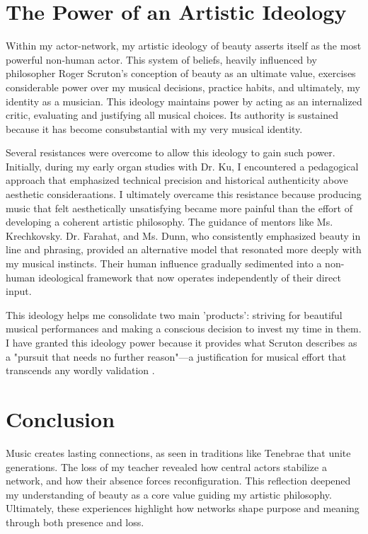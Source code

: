 \documentclass{article} %
\begin{document}
\section{The Power of an Artistic Ideology}

Within my actor-network, my artistic ideology of beauty asserts itself as the most powerful non-human actor.
This system of beliefs, heavily influenced by philosopher Roger Scruton's conception of beauty as an ultimate value, exercises considerable power over my musical decisions, practice habits, and ultimately, my identity as a musician.
This ideology maintains power by acting as an internalized critic, evaluating and justifying all musical choices. 
Its authority is sustained because it has become consubstantial with my very musical identity.

Several resistances were overcome to allow this ideology to gain such power. 
Initially, during my early organ studies with Dr. Ku, I encountered a pedagogical approach that emphasized technical precision and historical authenticity above aesthetic consideraations.
I ultimately overcame this resistance because producing music that felt aesthetically unsatisfying became more painful than the effort of developing a coherent artistic philosophy. 
The guidance of mentors like Ms. Krechkovsky. Dr. Farahat, and Ms. Dunn, who consistently emphasized beauty in line and phrasing, provided an alternative model that resonated more deeply with my musical instincts. 
Their human influence gradually sedimented into a non-human ideological framework that now operates independently of their direct input.

This ideology helps me consolidate two main 'products': striving for beautiful musical performances and making a conscious decision to invest my time in them.
I have granted this ideology power because it provides what Scruton describes as a "pursuit that needs no further reason"—a justification for musical effort that transcends any wordly validation \citep{pearman2024scruton}.

\section{Conclusion}

Music creates lasting connections, as seen in traditions like Tenebrae that unite generations. 
The loss of my teacher revealed how central actors stabilize a network, and how their absence forces reconfiguration. 
This reflection deepened my understanding of beauty as a core value guiding my artistic philosophy. 
Ultimately, these experiences highlight how networks shape purpose and meaning through both presence and loss.

\newpage





\label{last_page}
\end{document}
